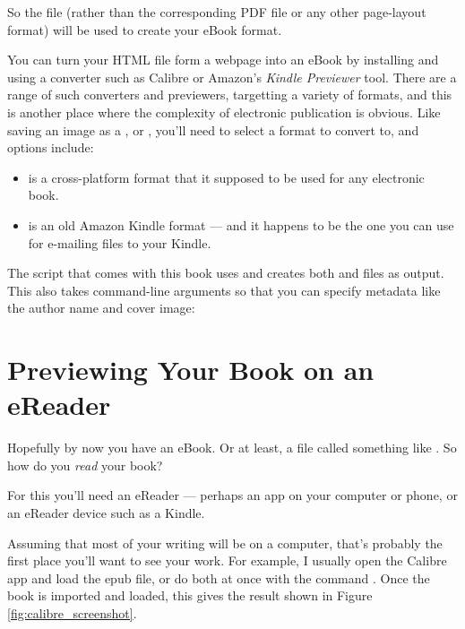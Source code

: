 So the  file (rather than the corresponding
PDF file or any other page-layout format) will be used to
create your eBook format. 

You can turn your HTML file form a webpage into an eBook by installing
and using a converter such as Calibre  or
Amazon's {\em Kindle Previewer} tool.
There are a range of such converters and previewers, targetting a
variety of formats, and this is another place where the complexity of
electronic publication is obvious. Like saving an image as a
,  or , you'll need to select a
format to convert to, and options include:

\begin{itemize}
  \item {} is a cross-platform format that it supposed to
    be used for any electronic book.
  \item {} is an old Amazon Kindle format --- and it
    happens to be the one you can use for e-mailing files to your Kindle.
\end{itemize}

The  script that comes with this book uses
 and creates both  and
 files as output. This also takes command-line
arguments so that you can specify metadata like the author name
and cover image:

{\flushleft \quad {}}

\section{Previewing Your Book on an eReader}

Hopefully by now you have an eBook. Or at least, a file called something like
. So how do you {\em read} your book?

For this you'll need an eReader --- perhaps an app on your computer or phone,
or an eReader device such as a Kindle.

Assuming that most of your writing will be on a computer, that's
probably the first place you'll want to see your work. For example, I
usually open the Calibre app and load the epub file, or do both at
once with the command . Once the book is imported and loaded, this gives 
the result shown in Figure \ref{fig:calibre_screenshot}.

